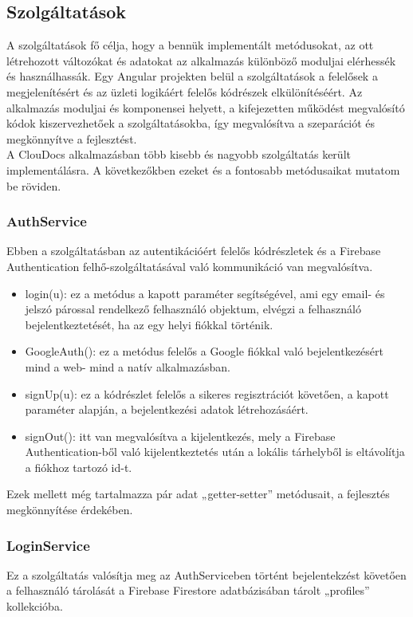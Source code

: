 \documentclass[12pt, twoside]{report}
\begin{document}
\subsection{Szolgáltatások}
A szolgáltatások fő célja, hogy a bennük implementált metódusokat, az ott létrehozott változókat és adatokat az alkalmazás különböző moduljai elérhessék és használhassák. Egy Angular projekten belül a szolgáltatások a felelősek a megjelenítésért és az üzleti logikáért felelős kódrészek elkülönítéséért. Az alkalmazás moduljai és komponensei helyett, a kifejezetten működést megvalósító kódok kiszervezhetőek a szolgáltatásokba, így megvalósítva a szeparációt és megkönnyítve a fejlesztést.\\
A ClouDocs alkalmazásban több kisebb és nagyobb szolgáltatás került implementálásra. A következőkben ezeket és a fontosabb metódusaikat mutatom be röviden.

\subsubsection{AuthService}
Ebben a szolgáltatásban az autentikációért felelős kódrészletek és a Firebase Authentication felhő-szolgáltatásával való kommunikáció van megvalósítva.

\begin{itemize}
	\item login(u): ez a metódus a kapott paraméter segítségével, ami egy email- és jelszó párossal rendelkező felhasználó objektum, elvégzi a felhasználó bejelentkeztetését, ha az egy helyi fiókkal történik.
	\item GoogleAuth(): ez a metódus felelős a Google fiókkal való bejelentkezésért mind a web- mind a natív alkalmazásban.
	\item signUp(u): ez a kódrészlet felelős a sikeres regisztrációt követően, a kapott paraméter alapján, a bejelentkezési adatok létrehozásáért.
	\item signOut(): itt van megvalósítva a kijelentkezés, mely a Firebase Authentication-ből való kijelentkeztetés után a lokális tárhelyből is eltávolítja a fiókhoz tartozó id-t.
\end{itemize}

Ezek mellett még tartalmazza pár adat „getter-setter” metódusait, a fejlesztés megkönnyítése érdekében.

\subsubsection{LoginService}
Ez a szolgáltatás valósítja meg az AuthServiceben történt bejelentekzést követően a felhasználó tárolását a Firebase Firestore adatbázisában tárolt „profiles” kollekcióba.
\end{document}
